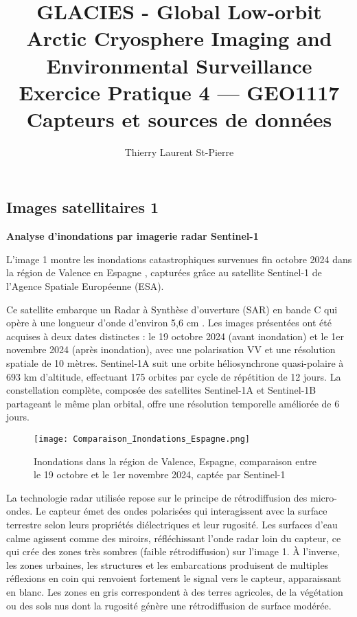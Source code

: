 \documentclass[12pt,a4paper]{article}
\title{
\vspace{2cm}
\Large\textbf{GLACIES - Global Low-orbit Arctic Cryosphere Imaging and Environmental Surveillance\\
\vspace{3cm}
Exercice Pratique 4 --- GEO1117 \\
Capteurs et sources de données}
\vspace{1cm}
}
\author{Thierry Laurent St-Pierre}
\date{
20 mars 2025\\
\vspace{1cm}

}
\begin{document}
\maketitle

\tableofcontents
\thispagestyle{empty}
\newpage

\subsection{Images satellitaires 1}

\textbf{Analyse d'inondations par imagerie radar Sentinel-1}

L'image 1 montre les inondations catastrophiques survenues fin octobre 2024 dans la région de Valence en Espagne \citep{ESA2024}, capturées grâce au satellite Sentinel-1 de l'Agence Spatiale Européenne (ESA). 

Ce satellite embarque un Radar à Synthèse d'ouverture (SAR) en bande C qui opère à une longueur d'onde d'environ 5,6 cm \citep{ESA2023}. Les images présentées ont été acquises à deux dates distinctes : le 19 octobre 2024 (avant inondation) et le 1er novembre 2024 (après inondation), avec une polarisation VV et une résolution spatiale de 10 mètres. Sentinel-1A suit une orbite héliosynchrone quasi-polaire à 693 km d'altitude, effectuant 175 orbites par cycle de répétition de 12 jours. La constellation complète, composée des satellites Sentinel-1A et Sentinel-1B partageant le même plan orbital, offre une résolution temporelle améliorée de 6 jours.

\begin{figure}[H]
    \centering
    \texttt{[image: Comparaison\_Inondations\_Espagne.png]}
    \caption{Inondations dans la région de Valence, Espagne, comparaison entre le 19 octobre et le 1er novembre 2024, captée par Sentinel-1}
    \label{fig:image1}
\end{figure}

La technologie radar utilisée repose sur le principe de rétrodiffusion des micro-ondes. Le capteur émet des ondes polarisées qui interagissent avec la surface terrestre selon leurs propriétés diélectriques et leur rugosité. Les surfaces d'eau calme agissent comme des miroirs, réfléchissant l'onde radar loin du capteur, ce qui crée des zones très sombres (faible rétrodiffusion) sur l'image 1. À l'inverse, les zones urbaines, les structures et les embarcations produisent de multiples réflexions en coin qui renvoient fortement le signal vers le capteur, apparaissant en blanc. Les zones en gris correspondent à des terres agricoles, de la végétation ou des sols nus dont la rugosité génère une rétrodiffusion de surface modérée.
\end{document}
